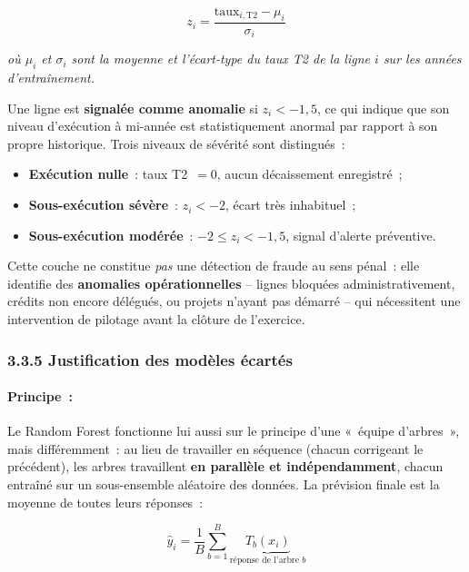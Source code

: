 $$z_i = \frac{\text{taux}_{i,\text{T2}} - \mu_i}{\sigma_i}$$

\noindent\small\textit{où $\mu_i$ et $\sigma_i$ sont la moyenne et l'écart-type du
taux T2 de la ligne $i$ sur les années d'entraînement.}\normalsize

Une ligne est \textbf{signalée comme anomalie} si $z_i < -1{,}5$, ce qui indique
que son niveau d'exécution à mi-année est statistiquement anormal par rapport à
son propre historique. Trois niveaux de sévérité sont distingués~:

\begin{itemize}
    \item \textbf{Exécution nulle}~: taux T2~$= 0$, aucun décaissement enregistré~;
    \item \textbf{Sous-exécution sévère}~: $z_i < -2$, écart très inhabituel~;
    \item \textbf{Sous-exécution modérée}~: $-2 \leq z_i < -1{,}5$, signal d'alerte préventive.
\end{itemize}

Cette couche ne constitue \textit{pas} une détection de fraude au sens pénal~: elle
identifie des \textbf{anomalies opérationnelles} -- lignes bloquées administrativement,
crédits non encore délégués, ou projets n'ayant pas démarré -- qui nécessitent une
intervention de pilotage avant la clôture de l'exercice.

\subsubsection*{3.3.5 \quad Justification des modèles écartés}

\paragraph{Principe~:}

Le Random Forest fonctionne lui aussi sur le principe d'une «~équipe d'arbres~»,
mais différemment~: au lieu de travailler en séquence (chacun corrigeant le
précédent), les arbres travaillent \textbf{en parallèle et indépendamment}, chacun
entraîné sur un sous-ensemble aléatoire des données. La prévision finale est la
moyenne de toutes leurs réponses~:

$$\hat{y}_i = \frac{1}{B} \sum_{b=1}^{B} \underbrace{T_b(x_i)}_{\text{r\'eponse de l'arbre }b}$$


